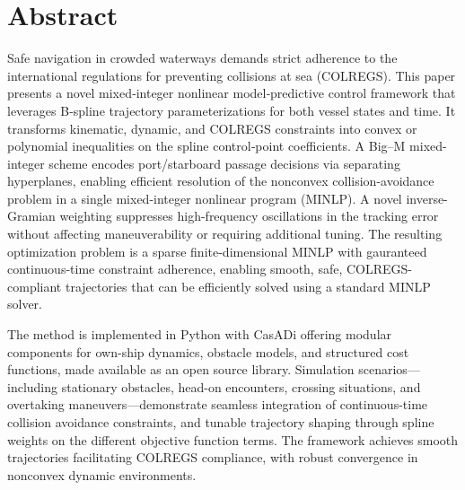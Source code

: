 
\pagestyle{fancy}
\fancyhf{}
\renewcommand{\chaptermark}[1]{\markboth{\chaptername\ \thechapter.\ #1}{}}
\renewcommand{\sectionmark}[1]{\markright{\thesection\ #1}}
\renewcommand{\headrulewidth}{0.1ex}
\renewcommand{\footrulewidth}{0.1ex}
\fancyfoot[LE,RO]{\thepage}
\fancypagestyle{plain}{\fancyhf{}\fancyfoot[LE,RO]{\thepage}\renewcommand{\headrulewidth}{0ex}}

\section*{\large Abstract}
\vspace{0.5cm}


Safe navigation in crowded waterways demands strict adherence to the international regulations for preventing collisions at sea (COLREGS). 
This paper presents a novel mixed‐integer nonlinear model‐predictive control framework that leverages B‐spline trajectory parameterizations for both vessel states and time. It transforms kinematic, dynamic, and COLREGS constraints into convex or polynomial inequalities on the spline control‐point coefficients.
A Big–M mixed-integer scheme encodes port/starboard passage decisions via separating hyperplanes, enabling efficient resolution of the nonconvex collision-avoidance problem in a single mixed-integer nonlinear program (MINLP).
A novel inverse-Gramian weighting suppresses high-frequency oscillations in the tracking error without affecting maneuverability or requiring additional tuning. The resulting optimization problem is a sparse finite-dimensional  MINLP with gauranteed continuous-time constraint adherence, enabling smooth, safe, COLREGS-compliant trajectories that can be efficiently solved using a standard MINLP solver.

The method is implemented in Python with CasADi offering modular components for own-ship dynamics, obstacle models, and structured cost functions, made available as an open source library. Simulation scenarios---including stationary obstacles, head-on encounters, crossing situations, and overtaking maneuvers---demonstrate seamless integration of continuous-time collision avoidance constraints, and tunable trajectory shaping through spline weights on the different objective function terms. The framework achieves smooth trajectories facilitating COLREGS compliance, with robust convergence in nonconvex dynamic environments. 

